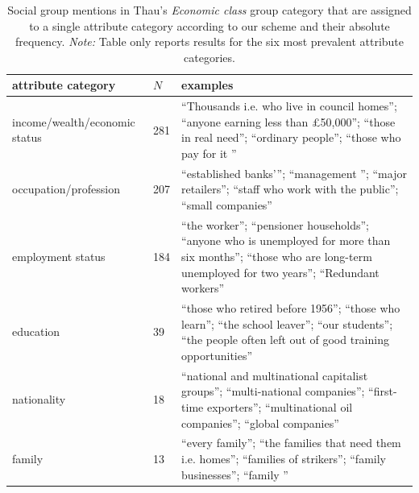 \begin{table}[!th]
\centering
\caption{Social group mentions in Thau's \emph{Economic class} group category that are assigned to a single attribute category according to our scheme and their absolute frequency. \emph{Note:} Table only reports results for the six most prevalent attribute categories.}
\label{tableC06}
\begin{tabular}{p{2.2in} l L{3in}}
\toprule
attribute category & $N$ & examples \\
\midrule
income/wealth/economic status & 281 & ``Thousands i.e. who live in council homes''; ``anyone earning less than £50,000''; ``those in real need''; ``ordinary people''; ``those who pay for it '' \\
occupation/profession & 207 & ``established banks’''; ``management ''; ``major retailers''; ``staff who work with the public''; ``small companies'' \\
employment status & 184 & ``the worker''; ``pensioner households''; ``anyone who is unemployed for more than six months''; ``those who are long-term unemployed for two years''; ``Redundant workers'' \\
education & 39 & ``those who retired before 1956''; ``those who learn''; ``the school leaver''; ``our students''; ``the people often left out of good training opportunities'' \\
nationality & 18 & ``national and multinational capitalist groups''; ``multi-national companies''; ``first-time exporters''; ``multinational oil companies''; ``global companies'' \\
family & 13 & ``every family''; ``the families that need them i.e. homes''; ``families of strikers''; ``family businesses''; ``family '' \\
\bottomrule
\end{tabular}
\end{table}
